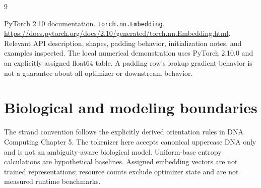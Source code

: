\renewcommand{\bibname}{Sources and reading notes}
\begin{thebibliography}{9}
PyTorch 2.10 documentation. \texttt{torch.nn.Embedding}.
\url{https://docs.pytorch.org/docs/2.10/generated/torch.nn.Embedding.html}.
Relevant API description, shapes, padding behavior, initialization notes,
and examples inspected. The local numerical demonstration uses PyTorch
2.10.0 and an explicitly assigned float64 table. A padding row's lookup
gradient behavior is not a guarantee about all optimizer or downstream behavior.

\end{thebibliography}

\section*{Biological and modeling boundaries}
The strand convention follows the explicitly derived orientation rules
in DNA Computing Chapter 5. The tokenizer here accepts canonical uppercase
DNA only and is not an ambiguity-aware biological model. Uniform-base
entropy calculations are hypothetical baselines. Assigned embedding vectors
are not trained representations; resource counts exclude optimizer state
and are not measured runtime benchmarks.
